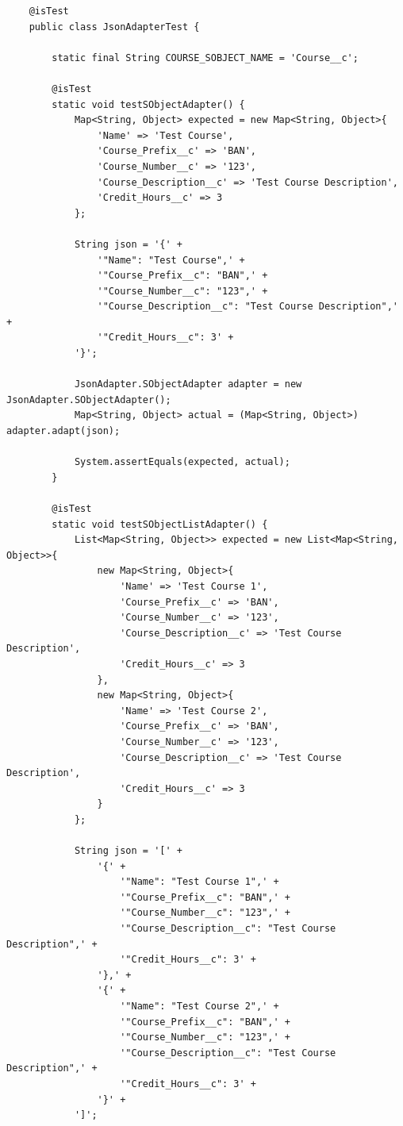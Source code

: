 \documentclass[12pt]{article}
\begin{document}
\begin{lstlisting}
    @isTest
    public class JsonAdapterTest {
    
        static final String COURSE_SOBJECT_NAME = 'Course__c';
    
        @isTest
        static void testSObjectAdapter() {
            Map<String, Object> expected = new Map<String, Object>{
                'Name' => 'Test Course',
                'Course_Prefix__c' => 'BAN',
                'Course_Number__c' => '123',
                'Course_Description__c' => 'Test Course Description',
                'Credit_Hours__c' => 3
            };
    
            String json = '{' +
                '"Name": "Test Course",' +
                '"Course_Prefix__c": "BAN",' +
                '"Course_Number__c": "123",' +
                '"Course_Description__c": "Test Course Description",' +
                '"Credit_Hours__c": 3' +
            '}';
    
            JsonAdapter.SObjectAdapter adapter = new JsonAdapter.SObjectAdapter();
            Map<String, Object> actual = (Map<String, Object>) adapter.adapt(json);
    
            System.assertEquals(expected, actual);
        }
    
        @isTest
        static void testSObjectListAdapter() {
            List<Map<String, Object>> expected = new List<Map<String, Object>>{
                new Map<String, Object>{
                    'Name' => 'Test Course 1',
                    'Course_Prefix__c' => 'BAN',
                    'Course_Number__c' => '123',
                    'Course_Description__c' => 'Test Course Description',
                    'Credit_Hours__c' => 3
                },
                new Map<String, Object>{
                    'Name' => 'Test Course 2',
                    'Course_Prefix__c' => 'BAN',
                    'Course_Number__c' => '123',
                    'Course_Description__c' => 'Test Course Description',
                    'Credit_Hours__c' => 3
                }
            };
    
            String json = '[' +
                '{' +
                    '"Name": "Test Course 1",' +
                    '"Course_Prefix__c": "BAN",' +
                    '"Course_Number__c": "123",' +
                    '"Course_Description__c": "Test Course Description",' +
                    '"Credit_Hours__c": 3' +
                '},' +
                '{' +
                    '"Name": "Test Course 2",' +
                    '"Course_Prefix__c": "BAN",' +
                    '"Course_Number__c": "123",' +
                    '"Course_Description__c": "Test Course Description",' +
                    '"Credit_Hours__c": 3' +
                '}' +
            ']';
    

\end{lstlisting}
\end{document}
